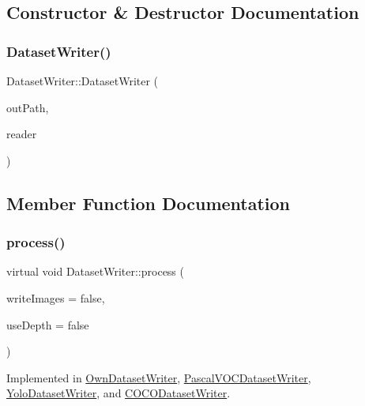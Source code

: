 \subsection{Constructor \& Destructor Documentation}
\mbox{\label{class_dataset_writer_a96cb64791602cd684ec3a05156a7c28e}} 
\subsubsection{\texorpdfstring{Dataset\+Writer()}{DatasetWriter()}}
{\footnotesize\ttfamily Dataset\+Writer\+::\+Dataset\+Writer (\begin{DoxyParamCaption}\item[{const std\+::string \&}]{out\+Path,  }\item[{\hyperlink{_dataset_reader_8h_a30d89cba514a220d64d04535c0465f1c}{Dataset\+Reader\+Ptr} \&}]{reader }\end{DoxyParamCaption})}



\subsection{Member Function Documentation}
\mbox{\label{class_dataset_writer_a97270b2e182e6c08d9342d8db42710fd}} 
\subsubsection{\texorpdfstring{process()}{process()}}
{\footnotesize\ttfamily virtual void Dataset\+Writer\+::process (\begin{DoxyParamCaption}\item[{bool}]{write\+Images = {\ttfamily false},  }\item[{bool}]{use\+Depth = {\ttfamily false} }\end{DoxyParamCaption})\hspace{0.3cm}{\ttfamily [pure virtual]}}



Implemented in \hyperlink{class_own_dataset_writer_a63b35dd2752ea15af5ab5b25693d135c}{Own\+Dataset\+Writer}, \hyperlink{class_pascal_v_o_c_dataset_writer_a93b4aa44b217491ddf99348b2517e6ea}{Pascal\+V\+O\+C\+Dataset\+Writer}, \hyperlink{class_yolo_dataset_writer_a29ecb0d94701fc78b0b800d9665ca70d}{Yolo\+Dataset\+Writer}, and \hyperlink{class_c_o_c_o_dataset_writer_a82b054ee143507382ae3f87b46c246d6}{C\+O\+C\+O\+Dataset\+Writer}.



